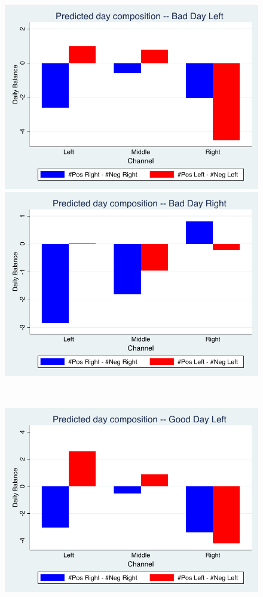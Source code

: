 \documentclass[12pt]{article}
\begin{document}
\begin{figure}[ht] 			
	\begin{minipage}[b]{0.5\linewidth}
		\centering
		\includegraphics[width=.9\linewidth]{figures/predicted_bad_left} 
		\vspace{4ex}
	\end{minipage}%
	\begin{minipage}[b]{0.5\linewidth}
		\centering
				\includegraphics[width=.9\linewidth]{figures/predicted_bad_right} 
		\vspace{4ex}
	\end{minipage} 
\\
	\begin{minipage}[b]{0.5\linewidth}
		\centering
		\includegraphics[width=.9\linewidth]{figures/predicted_good_left} 

\end{minipage}
\end{figure}
\end{document}
